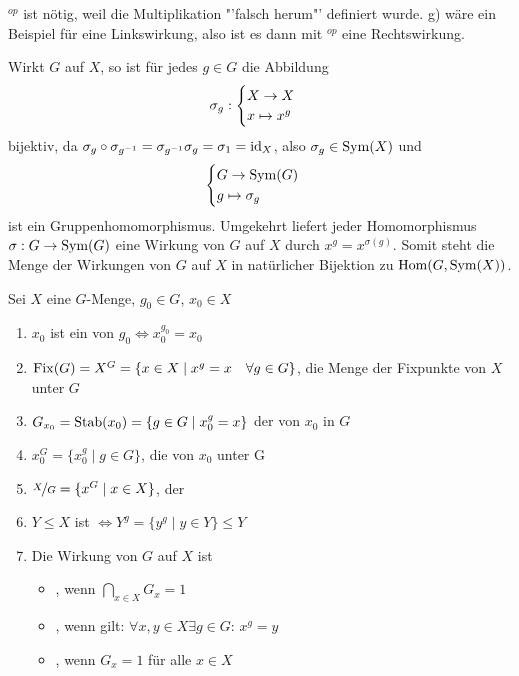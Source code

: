 \begin{*anmerkung}
	$^{op}$ ist nötig, weil die Multiplikation "'falsch herum"' definiert wurde. g) wäre ein Beispiel für eine Linkswirkung, also ist es dann mit $^{op}$ eine Rechtswirkung.
\end{*anmerkung}

\begin{remark}
	Wirkt $G$ auf $X$, so ist für jedes $g\in G$ die Abbildung
	\begin{align}
		\sigma_g: \begin{cases}
			X\to X \\ x\mapsto x^g
		\end{cases} \notag
	\end{align}
	bijektiv, da $\sigma_g\circ\sigma_{g^{-1}}=\sigma_{g^{-1}}\sigma_g=\sigma_1=\operatorname{id}_X$, also $\sigma_g\in\operatorname{Sym}(X)$ und
	\begin{align}
		\begin{cases}
			G\to \operatorname{Sym}(G) \\ g\mapsto \sigma_g
		\end{cases}\notag
	\end{align}
	ist ein Gruppenhomomorphismus. Umgekehrt liefert jeder Homomorphismus $\sigma: G\to\operatorname{Sym}(G)$ eine Wirkung von $G$ auf $X$ durch $x^g=x^{\sigma(g)}$. Somit steht die Menge der Wirkungen von $G$ auf $X$ in natürlicher Bijektion zu $\operatorname{Hom}(G,\operatorname{Sym}(X))$.
\end{remark}

\begin{definition}
	Sei $X$ eine $G$-Menge, $g_0\in G$, $x_0\in X$
	\begin{enumerate}[label=(\alph*)]
		\item $x_0$ ist ein  von $g_0\Leftrightarrow x_0^{g_0}=x_0$
		\item $\operatorname{Fix}(G) = X^G = \{x\in X\mid x^g=x\quad\forall g\in G\}$, die Menge der Fixpunkte von $X$ unter $G$
		\item $G_{x_0} = \operatorname{Stab}(x_0) = \{g\in G\mid x_0^g = x\}$ der  von $x_0$ in $G$
		\item $x_0^G = \{x_0^g \mid g\in G\}$, die  von $x_0$ unter G
		\item $\nicefrac{X}{G} = \{x^G\mid x\in X\}$, der 
		\item $Y\le X$ ist  $\Leftrightarrow Y^g = \{y^g\mid y\in Y\}\le Y$
		\item Die Wirkung von $G$ auf $X$ ist
		\begin{itemize}
			\item {}, wenn $\bigcap_{x\in X} G_x=1$
			\item {}, wenn gilt: $\forall x,y\in X\exists g\in G$: $x^g=y$
			\item {}, wenn $G_x=1$ für alle $x\in X$
		\end{itemize}
	\end{enumerate}
\end{definition}

